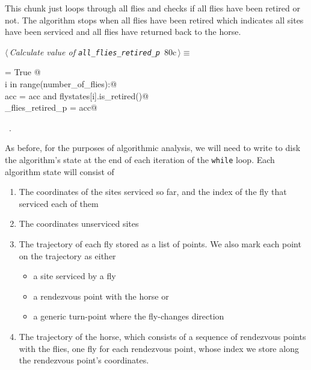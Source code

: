 \documentclass[11.5pt]{report}
\begin{document}
\vspace{-0.8cm} \newchunk This chunk just loops through all flies and checks if all flies have been retired or not. 
The algorithm stops when all flies have been retired which indicates all sites have been serviced and all flies have 
returned back to the horse.
\begin{flushleft} \small
\begin{minipage}{\linewidth}\label{scrap126}\raggedright\small
{} $\langle\,${\itshape Calculate value of \verb|all_flies_retired_p|}\nobreak\ {\footnotesize {80c}}$\,\rangle\equiv$
\vspace{-1ex}
\begin{list}{}{} \item
\mbox{}\verb@acc = True @\\
\mbox{}\verb@for i in range(number_of_flies):@\\
\mbox{}\verb@     acc = acc and flystates[i].is_retired()@\\
\mbox{}\verb@all_flies_retired_p = acc@\\
\mbox{}\verb@@{\NWsep}
\end{list}
\vspace{-1.5ex}
\footnotesize
\begin{list}{}{\setlength{\itemsep}{-\parsep}\setlength{\itemindent}{-\leftmargin}}
\item \NWtxtMacroRefIn\ .

\item{}
\end{list}
\end{minipage}\vspace{4ex}
\end{flushleft}

\vspace{-0.8cm}\newchunk As before, for the purposes of algorithmic analysis, we will need to write to disk 
the algorithm's state at the end of each iteration of the \verb|while| loop. Each algorithm 
state will consist of 

\begin{enumerate}
  \item The coordinates of the sites serviced so far, and the index of the fly that serviced each of them
  \item The coordinates unserviced sites
  \item The trajectory of each fly stored as a list of points. We also mark each point on the trajectory as either 
      \begin{itemize}
          \item a site serviced by a fly
          \item a rendezvous point with the horse or
          \item a generic turn-point where the fly-changes direction
       \end{itemize}
  \item The trajectory of the horse, which consists of a sequence of rendezvous points with the flies, 
        one fly for each rendezvous point, whose index we store along the rendezvous point's coordinates. 
\end{enumerate}
\end{document}

